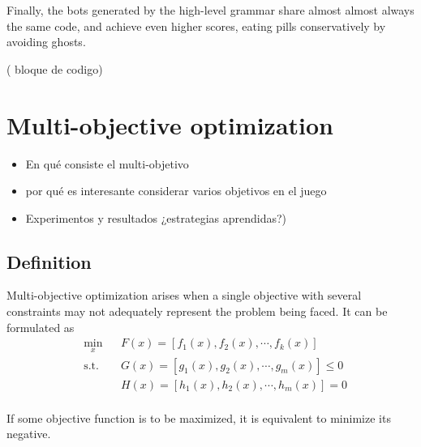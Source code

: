 \documentclass{llncs}
\newcommand{\pacman}{Ms. Pac-Man vs. Ghosts }
\newcommand{\paco}{Pac-Man }
\begin{document}
Finally, the bots generated by the high-level grammar share almost almost always the same code, and achieve even higher scores, eating pills conservatively by avoiding ghosts.


({\color{red} bloque de codigo})

%
\section{Multi-objective optimization}
\label{sec:sec3}
%

\begin{itemize}
\item En qué consiste el multi-objetivo
\item por qué es interesante considerar varios objetivos en el juego
\item Experimentos y resultados  ¿estrategias aprendidas?)
\end{itemize}

\subsection{Definition}
Multi-objective optimization arises when a single objective with several constraints may not adequately represent the problem being faced. It can be formulated as
\begin{equation}
\begin{aligned}
& \underset{x}{\text{min}}
& & F(x) = [f_1(x), f_2(x), \cdots, f_k(x)] \\
& \text{s.t.} & &  G(x) = [g_1(x), g_2(x), \cdots, g_m(x)] \leq 0 \\
& & &  H(x) = [h_1(x), h_2(x), \cdots, h_m(x)] = 0 \\
\end{aligned}
\end{equation}

If some objective function is to be maximized, it is equivalent to minimize its negative.
\end{document}
